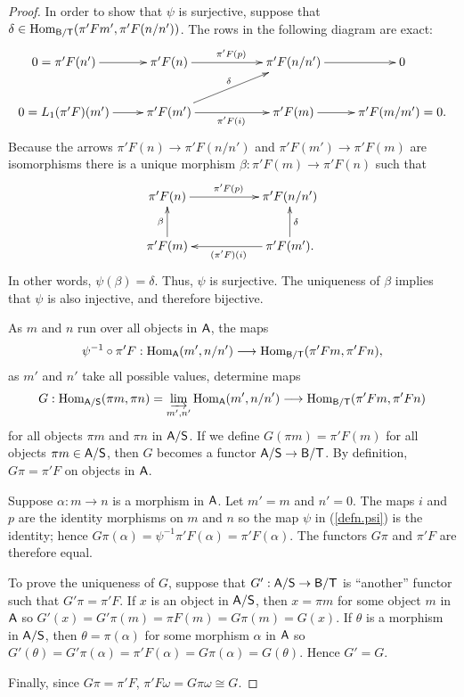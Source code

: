 \documentclass[10pt]{amsart}
\numberwithin{equation}{section}
\def\Hom{\operatorname {Hom}}
\def\Hom{\operatorname{Hom}}
\def\liminj{\varinjlim}
\def\d{\downarrow}
\def\a{\alpha}
\def\b{\beta}
\def\d{\delta}
\def\sA{{\sf A}}
\def\sB{{\sf B}}
\def\sS{{\sf S}}
\def\sT{{\sf T}}
\begin{document}
\begin{proof}
In order to show that $\psi$ is surjective, suppose that $\d \in  \Hom_{\sB/\sT}(\pi'Fm',\pi'F(n/n'))$. The rows in the following
diagram are exact:
$$
\xymatrix{
0 = \pi'F(n') \ar[r] & \pi'F(n) \ar[rr]^{\pi'F(p)} && \pi'F(n/n') \ar[r] & 0
\\
 0 = L_1(\pi'F)(m') \ar[r] & \pi'F(m') \ar[urr]^\d \ar[rr]_{\pi'F(i)}  && \pi'F(m) \ar[r] & \pi'F(m/m') = 0.
 }
 $$
 Because the arrows $\pi'F(n) \to \pi'F(n/n')$ and $ \pi'F(m') \to \pi'F(m)$ are isomorphisms there is a unique morphism 
 $\b:\pi'F(m) \to \pi'F(n)$ such that 
 $$
\xymatrix{
 \pi'F(n) \ar[rr]^{\pi'F(p)} && \pi'F(n/n')  
\\
\ar[u]^\b  \pi'F(m) && \pi'F(m') \ar[ll]^{(\pi'F)(i)}.  \ar[u]_\d 
 }
 $$
In other words, $\psi(\b)=\d$. Thus, $\psi$ is surjective. The uniqueness of $\b$ implies that $\psi$ is also injective,
and therefore bijective. 

As $m$ and $n$ run over all objects in $\sA$, 
the maps 
$$
\psi^{-1} \circ \pi'F: \Hom_{\sA}(m',n/n') \longrightarrow \Hom_{\sB/\sT}(\pi'Fm,\pi'Fn),
$$
as $m'$ and $n'$ take all possible values, determine maps
$$
G: \Hom_{\sA/\sS}(\pi m, \pi n) =  \liminj_{m',n'} \Hom_{\sA}(m',n/n') \longrightarrow \Hom_{\sB/\sT}(\pi'Fm,\pi'Fn)
$$
for all objects $\pi m$ and $\pi n$ in $\sA/\sS$. If we define $G(\pi m)=\pi'F(m)$ for all objects $\pi m \in \sA/\sS$, then $G$ becomes
a functor $\sA/\sS \to \sB/\sT$. By definition, $G\pi=\pi' F$ on objects in $\sA$. 

Suppose $\a:m \to n$ is a morphism in $\sA$. Let $m'=m$ and $n'=0$. The maps $i$ and $p$ are the identity morphisms
on $m$ and $n$ so the map $\psi$ in (\ref{defn.psi}) is the identity; hence $G \pi(\a)=\psi^{-1}\pi'F(\a)=\pi'F(\a)$. 
The functors $G\pi$ and $\pi'F$ are therefore equal. 

To prove the uniqueness of $G$, suppose that  $G':\sA/\sS \to \sB/\sT$ is ``another'' functor such that  $G'\pi=\pi' F$.
If $x$ is an object in $\sA/\sS$, then $x=\pi m$ for some object $m$ in $\sA$ so $G'(x)=G'\pi(m)=\pi F(m)=G\pi(m)=G(x)$.
If $\theta$ is a morphism in $\sA/\sS$, then $\theta=\pi(\a)$ for some morphism $\a$ in $\sA$ so
$G'(\theta)=G'\pi(\a)=\pi' F(\a)=G\pi(\a)=G(\theta)$. Hence $G'=G$. 

Finally, since $G\pi=\pi'F$, $\pi' F \omega = G \pi\omega \cong G$.



\end{proof}
\end{document}

